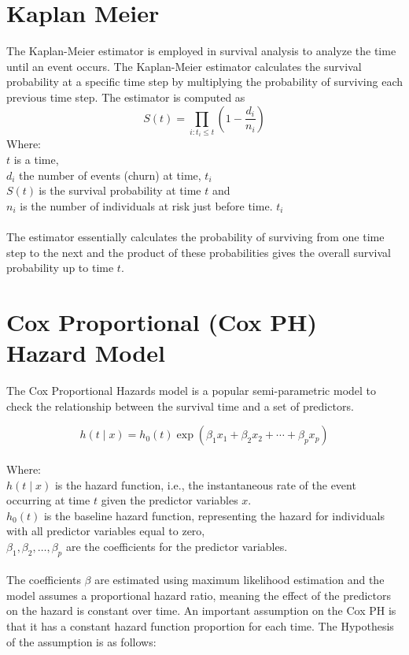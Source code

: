 \documentclass[doublespacing,12pt]{report}
\begin{document}
\section{Kaplan Meier}
The Kaplan-Meier estimator is employed in survival analysis to analyze the time until an event occurs. The Kaplan-Meier estimator calculates the survival probability at a specific time step by multiplying the probability of surviving each previous time step.
The estimator is computed as
\begin{equation}
S\left(t\right)=\prod_{i:t_i\le t}\left(1-\frac{d_i}{n_i}\right)
\end{equation}
Where:\\
     \(t\) is a time,\\
      \(d_i \) the number of events (churn) at time, \(t_i\)\\
      \(S\left(t\right)\ \)is the survival probability at time \(t\) and\\
      \(n_i\) is the number of individuals at risk just before time. \(t_i\)\\
\\ The estimator essentially calculates the probability of surviving from one time step to the next and the product of these probabilities gives the overall survival probability up to time \(t\).

\section{Cox Proportional (Cox PH) Hazard Model}

The Cox Proportional Hazards model is a popular semi-parametric model to check the relationship between the survival time and a set of predictors.

\begin{equation}
h\left(t \mid x\right) = h_0(t) \exp(\beta_1 x_1 + \beta_2 x_2 + \cdots + \beta_p x_p)
\end{equation}\\
Where:\\
\vspace{0.1in}
 \noindent  \(h(t\mid x)\) is the hazard function, i.e., the instantaneous rate of the event occurring at time \(t\) given the predictor variables \(x\).\\
\vspace{0.1in}
 \noindent  \(h_0\left(t\right)\) is the baseline hazard function, representing the hazard for individuals with all predictor variables equal to zero,\\
\vspace{0.1in}
 \noindent    \(\beta_1,\beta_2,\ldots,\beta_p\) are the coefficients for the predictor variables.\\
\vspace{0.1in}
\\ The coefficients \(\beta\) are estimated using maximum likelihood estimation and the model assumes a proportional hazard ratio, meaning the effect of the predictors on the hazard is constant over time.
An important assumption on the Cox PH is that it has a constant hazard function proportion for each time. The Hypothesis of the assumption is as follows: 
\end{document}
